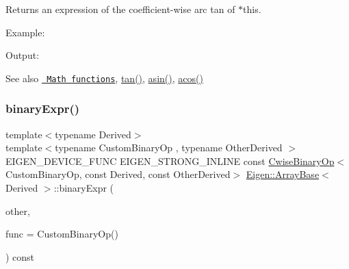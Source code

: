 \begin{DoxyReturn}{Returns}
an expression of the coefficient-\/wise arc tan of $\ast$this.
\end{DoxyReturn}
Example\+: 
\begin{DoxyCodeInclude}{0}
\end{DoxyCodeInclude}
 Output\+: 
\begin{DoxyVerbInclude}
\end{DoxyVerbInclude}


\begin{DoxySeeAlso}{See also}
\href{group__CoeffwiseMathFunctions.html\#cwisetable_atan}{\texttt{ Math functions}}, \mbox{\hyperlink{class_eigen_1_1_array_base_acc502922cf9aeb43b07b30f250cd1d21}{tan()}}, \mbox{\hyperlink{class_eigen_1_1_array_base_a6d090b549b70fcb9468d16341c2204f2}{asin()}}, \mbox{\hyperlink{class_eigen_1_1_array_base_a823b8a01037260c26ea853f41a75dd87}{acos()}} 
\end{DoxySeeAlso}
\mbox{\label{class_eigen_1_1_array_base_a97444338583fdd6ea18b4a3ae8e1553b}} 
\subsubsection{\texorpdfstring{binaryExpr()}{binaryExpr()}}
{\footnotesize\ttfamily template$<$typename Derived$>$ \\
template$<$typename Custom\+Binary\+Op , typename Other\+Derived $>$ \\
E\+I\+G\+E\+N\+\_\+\+D\+E\+V\+I\+C\+E\+\_\+\+F\+U\+NC E\+I\+G\+E\+N\+\_\+\+S\+T\+R\+O\+N\+G\+\_\+\+I\+N\+L\+I\+NE const \mbox{\hyperlink{class_eigen_1_1_cwise_binary_op}{Cwise\+Binary\+Op}}$<$Custom\+Binary\+Op, const Derived, const Other\+Derived$>$ \mbox{\hyperlink{class_eigen_1_1_array_base}{Eigen\+::\+Array\+Base}}$<$ Derived $>$\+::binary\+Expr (\begin{DoxyParamCaption}\item[{const E\+I\+G\+E\+N\+\_\+\+C\+U\+R\+R\+E\+N\+T\+\_\+\+S\+T\+O\+R\+A\+G\+E\+\_\+\+B\+A\+S\+E\+\_\+\+C\+L\+A\+SS$<$ Other\+Derived $>$ \&}]{other,  }\item[{const Custom\+Binary\+Op \&}]{func = {\ttfamily CustomBinaryOp()} }\end{DoxyParamCaption}) const\hspace{0.3cm}{\ttfamily [inline]}}

